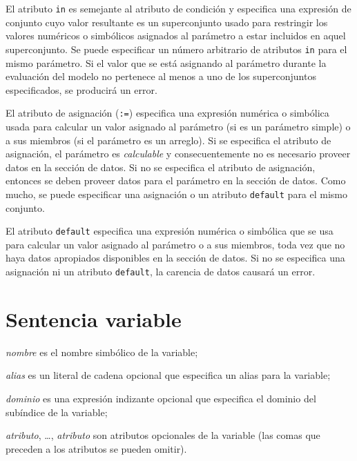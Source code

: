 \documentclass[11pt,spanish]{report}
\begin{document}
El atributo {\tt in} es semejante al atributo de condición y especifica una expresión de conjunto cuyo valor resultante es un superconjunto usado para restringir los valores numéricos o simbólicos asignados al parámetro a estar incluidos en aquel superconjunto. Se puede especificar un número arbitrario de atributos {\tt in} para el mismo parámetro. Si el valor que se está asignando al parámetro durante la evaluación del modelo no pertenece al menos a uno de los superconjuntos especificados, se producirá un error.

El atributo de asignación ({\tt:=}) especifica una expresión numérica o simbólica usada para calcular un valor asignado al parámetro (si es un parámetro simple) o a sus miembros (si el parámetro es un arreglo). Si se especifica el atributo de asignación, el parámetro es {\it calculable} y consecuentemente no es necesario proveer datos en la sección de datos. Si no se especifica el atributo de asignación, entonces se deben proveer datos para el parámetro en la sección de datos. Como mucho, se puede especificar una asignación o un atributo {\tt default} para el mismo conjunto.

El atributo {\tt default} especifica una expresión numérica o simbólica que se usa para calcular un valor asignado al parámetro o a sus miembros, toda vez que no haya datos apropiados disponibles en la sección de datos. Si no se especifica una asignación ni un atributo {\tt default}, la carencia de datos causará un error.

\section{Sentencia variable}

\noindent
{}

\medskip

\noindent
{\it nombre} es el nombre simbólico de la variable;

\noindent
{\it alias} es un literal de cadena opcional que especifica un alias para la variable;

\noindent
{\it dominio} es una expresión indizante opcional que especifica el dominio del subíndice de la variable;

\noindent
{\it atributo}, \dots, {\it atributo} son atributos opcionales de la variable (las comas que preceden a los atributos se pueden omitir).
\end{document}
